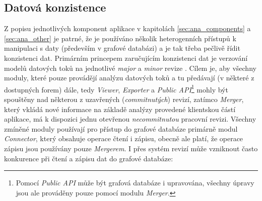 \subsection{Datová konzistence}
\label{sec:ana_transactions}
Z popisu jednotlivých komponent aplikace v kapitolách \ref{sec:ana_components} a \ref{sec:ana_other} je patrné, že je používáno několik heterogenních přístupů k manipulaci s daty (především v grafové databázi) a je tak třeba pečlivě řídit konzistenci dat. Primárním princepem zaručujícím konzistenci dat je verzování modelů datových toků na jednotlivé \textit{major} a \textit{minor} revize \cite{Sykora17}.
Cílem je, aby všechny moduly, které pouze provádějí analýzu datových toků a tu předávají (v některé z dostupných forem) dále, tedy \textit{Viewer}, \textit{Exporter} a \textit{Public API}\footnote{Pomocí \textit{Public API} může být grafová databáze i upravována, všechny úpravy jsou ale prováděny pouze pomocí modulu \textit{Merger}.} mohly být spouštěny nad některou z uzavřených (\textit{commitnutých}) revizí, zatímco \textit{Merger}, který vkládá nové informace na základě analýzy provedené klientskou částí aplikace, má k dispozici jednu otevřenou \textit{necommitnutou} pracovní revizi. Všechny zmíněné moduly používají pro přístup do grafové databáze primárně modul \textit{Connector}, který obsahuje operace čtení i zápisu, obecně ale platí, že operace zápisu jsou používány pouze \textit{Mergerem}.
I přes systém revizí může vzniknout často konkurence při čtení a zápisu dat do grafové databáze:

